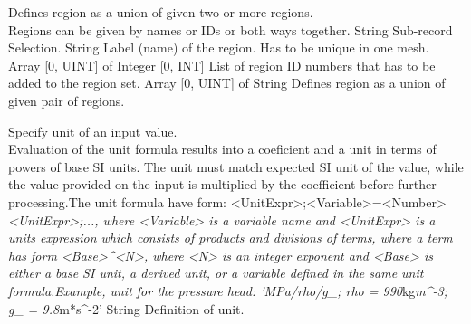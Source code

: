 \begin{RecordType}
	{}
	{} %
	{} %
	{} %
	{{{Defines region as a union of given two or more regions.}\\{
Regions can be given by names or IDs or both ways together.}}}
		\KeyItem
			{}
			{{String}}
			{\textrangle}
			{} %
			{{{Sub-record Selection.}}}
		\KeyItem
			{}
			{{String}}
			{\textrangle}
			{} %
			{{{Label (name) of the region. Has to be unique in one mesh.}}}
		\KeyItem
			{}
			{{Array [0, UINT] of }{Integer [0, INT]}}
			{\textrangle}
			{} %
			{{{List of region ID numbers that has to be added to the region set.}}}
		\KeyItem
			{}
			{{Array [0, UINT] of }{String}}
			{\textrangle}
			{} %
			{{{Defines region as a union of given pair of regions.}}}
\end{RecordType}
\begin{RecordType}
	{}
	{} %
	{} %
	{} %
	{{{Specify unit of an input value. }\\{
Evaluation of the unit formula results into a coeficient and a unit in terms of powers of base SI units. The unit must match expected SI unit of the value, while the value provided on the input is multiplied by the coefficient before further processing.The unit formula have form: {\textless}UnitExpr{\textgreater};{\textless}Variable{\textgreater}={\textless}Number{\textgreater}}\textit{{\textless}UnitExpr{\textgreater};..., where {\textless}Variable{\textgreater} is a variable name and {\textless}UnitExpr{\textgreater} is a units expression which consists of products and divisions of terms, where a term has form {\textless}Base{\textgreater}{\^{}}{\textless}N{\textgreater}, where {\textless}N{\textgreater} is an integer exponent and {\textless}Base{\textgreater} is either a base SI unit, a derived unit, or a variable defined in the same unit formula.Example, unit for the pressure head: 'MPa/rho/g{\_}; rho = 990}{kg}\textit{m{\^{}}-3; g{\_} = 9.8}{m*s{\^{}}-2'}}}
		\KeyItem
			{}
			{{String}}
			{\textrangle}
			{} %
			{{{Definition of unit.}}}
\end{RecordType}

